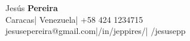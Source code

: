 \documentclass[10pt]{article}
\begin{document}
\begin{center}
\color{white}
{\fontsize{40}{60}\selectfont Jesús \textbf{Pereira}}
\vspace{2pt}\\
\vspace{2pt}
\faMapMarker\hspace{3pt}Caracas\hspace{25pt}|\hspace{25pt} Venezuela\hspace{25pt}|    \hspace{25pt}\faMobile\hspace{2pt} +58 424 1234715\\
jesusepereira@gmail.com\hspace{25pt}|\hspace{25pt}\faLinkedinSquare\hspace{3pt}/in/jeppires/\hspace{25pt}|\hspace{25pt} \faGithubSquare\hspace{3pt}/jesusepp    
\end{center}
 \vspace{20pt}
\end{document}
